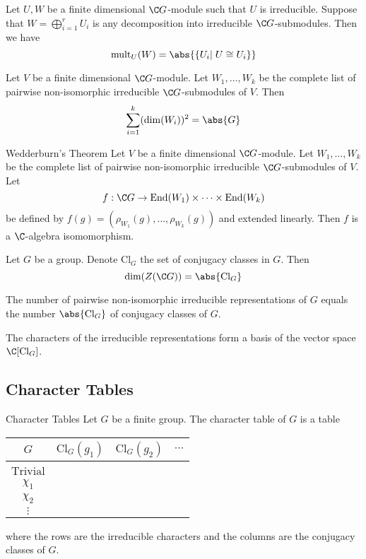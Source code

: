 \documentclass[a4paper]{article}
\begin{document}
\begin{lmm}{}{} Let $U,W$ be a finite dimensional $\C G$-module such that $U$ is irreducible. Suppose that $W=\bigoplus_{i=1}^rU_i$ is any decomposition into irreducible $\C G$-submodules. Then we have $$\text{mult}_U(W)=\abs{\{U_i|\;U\cong U_i\}}$$
\end{lmm}

\begin{lmm}{}{} Let $V$ be a finite dimensional $\C G$-module. Let $W_1,\dots, W_k$ be the complete list of pairwise non-isomorphic irreducible $\C G$-submodules of $V$. Then $$\sum_{i=1}^k(\dim(W_i))^2=\abs{G}$$
\end{lmm}

\begin{thm}{Wedderburn's Theorem}{} Let $V$ be a finite dimensional $\C G$-module. Let $W_1,\dots, W_k$ be the complete list of pairwise non-isomorphic irreducible $\C G$-submodules of $V$. Let $$f:\C G\to\text{End}(W_1)\times\cdots\times\text{End}(W_k)$$ be defined by $f(g)=(\rho_{W_1}(g),\dots,\rho_{W_k}(g))$ and extended linearly. Then $f$ is a $\C$-algebra isomomorphism. 
\end{thm}

\begin{prp}{}{} Let $G$ be a group. Denote $\text{Cl}_G$ the set of conjugacy classes in $G$. Then $$\dim(Z(\C G))=\abs{\text{Cl}_G}$$
\end{prp}

\begin{crl}{}{} The number of pairwise non-isomorphic irreducible representations of $G$ equals the number $\abs{\text{Cl}_G}$ of conjugacy classes of $G$. 
\end{crl}

\begin{crl}{}{} The characters of the irreducible representations form a basis of the vector space $\C[\text{Cl}_G]$. 
\end{crl}

\subsection{Character Tables}
\begin{defn}{Character Tables}{} Let $G$ be a finite group. The character table of $G$ is a table
\begin{center}
\begin{tabular}{ c|ccc } 
$G$ & $\text{Cl}_G(g_1)$ & $\text{Cl}_G(g_2)$ & $\cdots$ \\\hline
&&&\\
$\text{Trivial}$ & & & \\
$\chi_1$ & & & \\
$\chi_2$ & & & \\
$\vdots$ & & & \\
\end{tabular}
\end{center} where the rows are the irreducible characters and the columns are the conjugacy classes of $G$. 
\end{defn}
\end{document}
